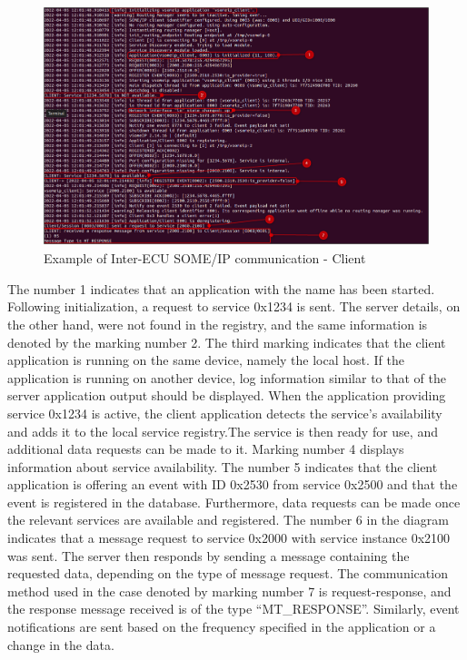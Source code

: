 \begin{figure}[!htb]
	\centering
		\includegraphics[width=1\textwidth, height=7cm, keepaspectratio]{images/res_client_1_eth0.png}
	\caption{Example of Inter-ECU SOME/IP communication - Client}
	\label{fig:res_client_1_eth0}
\end{figure}

\par The number 1 indicates that an application with the name  has been started. Following initialization, a request to service 0x1234 is sent. The server details, on the other hand, were not found in the registry, and the same information is denoted by the marking number 2. The third marking indicates that the client application is running on the same device, namely the local host. If the application is running on another device, log information similar to that of the server application output should be displayed. When the application providing service 0x1234 is active, the client application detects the service's availability and adds it to the local service registry.The service is then ready for use, and additional data requests can be made to it. Marking number 4 displays information about service availability. The number 5 indicates that the client application is offering an event with ID 0x2530 from service 0x2500 and that the event is registered in the database. Furthermore, data requests can be made once the relevant services are available and registered. The number 6 in the diagram indicates that a message request to service 0x2000 with service instance 0x2100 was sent. The server then responds by sending a message containing the requested data, depending on the type of message request. The communication method used in the case denoted by marking number 7 is request-response, and the response message received is of the type “MT\_RESPONSE”. Similarly, event notifications are sent based on the frequency specified in the application or a change in the data.

